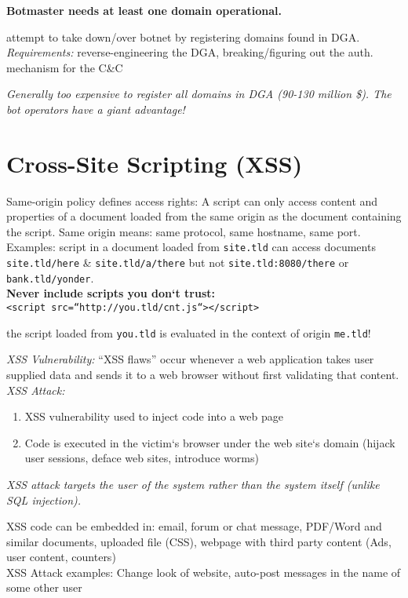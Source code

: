 \textbf{Botmaster needs at least one domain operational.}

 attempt to take down/over botnet by registering domains found in DGA.\\
\emph{Requirements:} reverse-engineering the DGA, breaking/figuring out the auth. mechanism for the C\&C

\textit{Generally too expensive to register all domains in DGA (90-130 million \$). The bot operators have a giant advantage!}

\section{Cross-Site Scripting (XSS)}

 Same-origin policy defines access rights: A script can
only access content and properties of a document loaded from the same origin as the document containing the script. Same origin means: same protocol, same hostname, same port.\\ Examples: script in a document loaded from {\tt site.tld} can access documents {\tt site.tld/here} \& {\tt site.tld/a/there} but not {\tt site.tld:8080/there} or {\tt bank.tld/yonder}.\\
\textbf{Never include scripts you don‘t trust:} \\
{\tt <script src=“http://you.tld/cnt.js“></script>}

the script loaded from {\tt you.tld} is evaluated in the context of origin {\tt me.tld}! 

 \textit{XSS Vulnerability:} ``XSS flaws'' occur whenever a web application takes user supplied data and sends it to a web browser without first validating that content.\\
\textit{XSS Attack:} 
\begin{enumerate}
\item XSS vulnerability used to inject code into a web page
\item Code is executed in the victim‘s browser under the web site‘s domain (hijack user sessions, deface web sites, introduce worms)
\end{enumerate}

\textit{XSS attack targets the user of the system rather than the system itself (unlike SQL injection).}

 XSS code can be embedded in: email, forum or chat message, PDF/Word and similar documents, uploaded file (CSS), webpage with third party content (Ads, user content, counters) \\
XSS Attack examples: Change look of website, auto-post messages in the name of some other user

